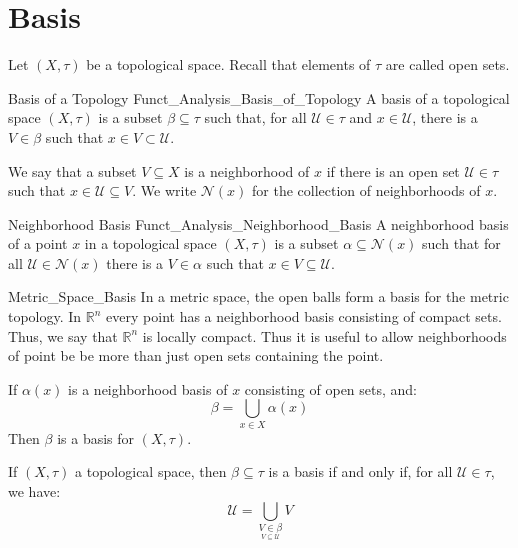     \section{Basis}
        Let $(X,\tau)$ be a topological space. Recall that
        elements of $\tau$ are called open sets.
        \begin{ldefinition}{Basis of a Topology}
              {Funct_Analysis_Basis_of_Topology}
            A basis of a topological space $(X,\tau)$ is a
            subset $\beta\subseteq\tau$ such that, for all
            $\mathcal{U}\in\tau$ and $x\in\mathcal{U}$, there
            is a $V\in\beta$ such that
            $x\in{V}\subset\mathcal{U}$.
        \end{ldefinition}
        We say that a subset $V\subseteq{X}$ is a neighborhood
        of $x$ if there is an open set
        $\mathcal{U}\in\tau$ such that
        $x\in\mathcal{U}\subseteq{V}$. We write
        $\mathscr{N}(x)$ for the collection of neighborhoods
        of $x$.
        \begin{ldefinition}{Neighborhood Basis}
              {Funct_Analysis_Neighborhood_Basis}
            A neighborhood basis of a point $x$ in a topological
            space $(X,\tau)$ is a subset
            $\alpha\subseteq\mathscr{N}(x)$ such that
            for all $\mathcal{U}\in\mathscr{N}(x)$ there is
            a $V\in\alpha$ such that
            $x\in{V}\subseteq\mathcal{U}$.
        \end{ldefinition}
        \begin{lexample}{}{Metric_Space_Basis}
            In a metric space, the open balls form
            a basis for the metric topology. In $\mathbb{R}^{n}$
            every point has a neighborhood basis consisting of
            compact sets. Thus, we say that $\mathbb{R}^{n}$
            is locally compact. Thus it is useful to allow
            neighborhoods of point be be more than just open
            sets containing the point.
        \end{lexample}
        \begin{theorem}
            If $\alpha(x)$ is a neighborhood basis of
            $x$ consisting of open sets, and:
            \begin{equation}
                \beta=\bigcup_{x\in{X}}\alpha(x)
            \end{equation}
            Then $\beta$ is a basis for $(X,\tau)$.
        \end{theorem}
        \begin{theorem}
            If $(X,\tau)$ a topological space, then
            $\beta\subseteq\tau$ is a basis if and only if,
            for all $\mathcal{U}\in\tau$, we have:
            \begin{equation}
                \mathcal{U}=
                \bigcup_{\underset{V\subseteq\mathcal{U}}
                    {V\in\beta}}V
            \end{equation}
        \end{theorem}
